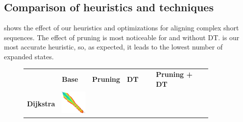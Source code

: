 \subsection{Comparison of heuristics and techniques}\label{app:comparison}
 shows the effect of our heuristics and optimizations for
aligning complex short sequences. The effect of pruning is most noticeable for
\CSH and \GCH without DT. \GCH is our most accurate heuristic, so, as expected,
it leads to the lowest number of expanded states.

\begin{figure}[t]
  \centering
  \begin{tabular}{l>{\centering}m{0.18\linewidth}>{\centering}m{0.18\linewidth}>{\centering}m{0.18\linewidth}>{\centering\arraybackslash}m{0.35\linewidth}}
    & \textbf{Base} & \textbf{Pruning} & \textbf{DT} & \textbf{Pruning + DT} \\
    \textbf{Dijkstra} &
    \includegraphics[scale=0.15]{imgs/comparison/dijkstra-noprune.png} &
    &

\end{tabular}
\end{figure}
